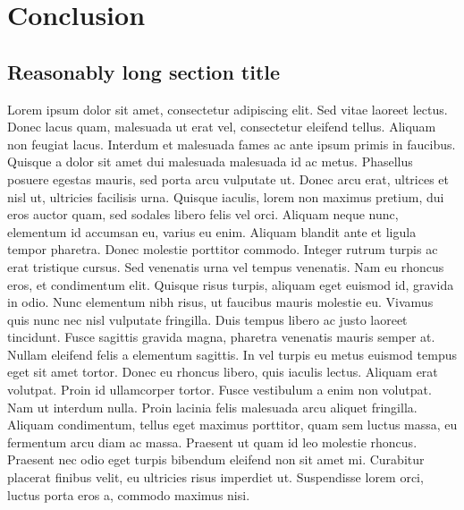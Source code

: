 
\chapter{Conclusion}

\ifpdf
    \graphicspath{{Chapter6/Figs/Raster/}{Chapter6/Figs/PDF/}{Chapter6/Figs/}}
\else
    \graphicspath{{Chapter6/Figs/Vector/}{Chapter6/Figs/}}
\fi


\section[Short title]{Reasonably long section title}

Lorem ipsum dolor sit amet, consectetur adipiscing elit. Sed vitae laoreet lectus.
Donec lacus quam, malesuada ut erat vel, consectetur eleifend tellus. Aliquam non
feugiat lacus. Interdum et malesuada fames ac ante ipsum primis in faucibus.
Quisque a dolor sit amet dui malesuada malesuada id ac metus. Phasellus posuere
egestas mauris, sed porta arcu vulputate ut. Donec arcu erat, ultrices et nisl ut,
ultricies facilisis urna. Quisque iaculis, lorem non maximus pretium, dui eros
auctor quam, sed sodales libero felis vel orci. Aliquam neque nunc, elementum id
accumsan eu, varius eu enim. Aliquam blandit ante et ligula tempor pharetra.
Donec molestie porttitor commodo. Integer rutrum turpis ac erat tristique cursus.
Sed venenatis urna vel tempus venenatis. Nam eu rhoncus eros, et condimentum elit.
Quisque risus turpis, aliquam eget euismod id, gravida in odio. Nunc elementum
nibh risus, ut faucibus mauris molestie eu.
Vivamus quis nunc nec nisl vulputate fringilla. Duis tempus libero ac justo
laoreet tincidunt. Fusce sagittis gravida magna, pharetra venenatis mauris
semper at. Nullam eleifend felis a elementum sagittis. In vel turpis eu metus
euismod tempus eget sit amet tortor. Donec eu rhoncus libero, quis iaculis lectus.
Aliquam erat volutpat. Proin id ullamcorper tortor. Fusce vestibulum a enim non
volutpat. Nam ut interdum nulla. Proin lacinia felis malesuada arcu aliquet fringilla.
Aliquam condimentum, tellus eget maximus porttitor, quam sem luctus massa,
eu fermentum arcu diam ac massa. Praesent ut quam id leo molestie rhoncus.
Praesent nec odio eget turpis bibendum eleifend non sit amet mi. Curabitur placerat
finibus velit, eu ultricies risus imperdiet ut. Suspendisse lorem orci, luctus
porta eros a, commodo maximus nisi.
